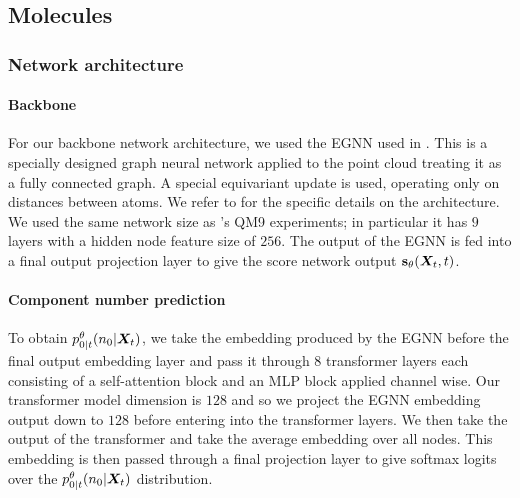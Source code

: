 \subsection{Molecules}

\subsubsection{Network architecture}
\paragraph{Backbone}
For our backbone network architecture, we used the EGNN used in \citet{hoogeboom2022equivariant}. This is a specially designed graph neural network applied to the point cloud treating it as a fully connected graph. A special equivariant update is used, operating only on distances between atoms. We refer to \citet{hoogeboom2022equivariant} for the specific details on the architecture. We used the same network size as \citet{hoogeboom2022equivariant}'s QM9 experiments; in particular it has $9$ layers with a hidden node feature size of $256$. The output of the EGNN is fed into a final output projection layer to give the score network output ${\mathbf{s}}_\theta({\bm{X}}_t, t)$.

\paragraph{Component number prediction}
To obtain $p_{0|t}^\theta(n_0 | {\bm{X}}_t)$,  we take the embedding produced by the EGNN before the final output embedding layer and pass it through 8 transformer layers each consisting of a self-attention block and an MLP block applied channel wise. Our transformer model dimension is $128$ and so we project the EGNN embedding output down to $128$ before entering into the transformer layers. We then take the output of the transformer and take the average embedding over all nodes. This embedding is then passed through a final projection layer to give softmax logits over the $p_{0|t}^\theta(n_0 | {\bm{X}}_t)$ distribution.

